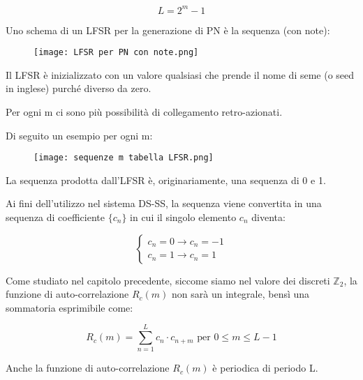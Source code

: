 {
    \Large 
    \begin{equation}
        L = 2^{m} - 1
    \end{equation}
}

Uno schema di un LFSR per la generazione di PN è la sequenza (con note): 

\begin{figure}[h]
    \centering
    \texttt{[image: LFSR per PN con note.png]}
\end{figure}

Il LFSR è inizializzato con un valore qualsiasi 
che prende il nome di seme (o seed in inglese) 
purché diverso da zero. \newline 

Per ogni m ci sono più possibilità di collegamento retro-azionati. \newline 

Di seguito un esempio per ogni m: 

\begin{figure}[h]
    \centering
    \texttt{[image: sequenze m tabella LFSR.png]}
\end{figure}

La sequenza prodotta dall'LFSR è, 
originariamente, una sequenza di 0 e 1. \newline 

Ai fini dell'utilizzo nel sistema DS-SS, 
la sequenza viene convertita in una sequenza di coefficiente $\{ c_n\}$ in cui il singolo elemento $c_n$ diventa: 

{
    \Large 
    \begin{equation}
        \begin{cases}
            c_n = 0 \to c_n = - 1 
            \\
            c_n = 1 \to c_n = 1
        \end{cases}
    \end{equation}
}

Come studiato nel capitolo precedente, 
siccome siamo nel valore dei discreti $\mathbb{Z}_{2}$, 
la funzione di auto-correlazione $R_c (m)$ non sarà un integrale, 
bensì una sommatoria esprimibile come: 

{
    \Large 
    \begin{equation}
        R_c (m)
        = 
        \sum_{n = 1}^{L}
        c_n \cdot c_{n+m} \text{ per } 0 \le m \le L-1
    \end{equation}
}

Anche la funzione di auto-correlazione $R_c (m)$ 
è periodica di periodo L. \newline 

